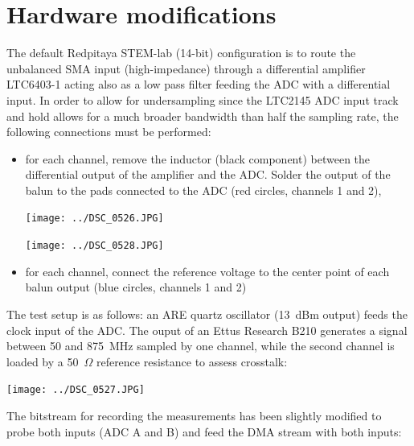 \documentclass[4paper]{article}
\begin{document}
\section{Hardware modifications}

The default Redpitaya STEM-lab (14-bit) configuration is to route the
unbalanced SMA input (high-impedance) through a differential
amplifier LTC6403-1 acting also as a low pass filter feeding the ADC with 
a differential input. In order to allow for undersampling since the LTC2145
ADC input track and hold allows for a much broader bandwidth than
half the sampling rate, the following connections must be performed:
\begin{itemize}
\item for each channel, remove the inductor (black component) between the
differential output of the amplifier and the ADC. Solder the output of the balun
to the pads connected to the ADC (red circles, channels 1 and 2),

\begin{center}
\begin{minipage}[t]{\linewidth}
\begin{minipage}{.45\linewidth}
\texttt{[image: ../DSC\_0526.JPG]}
\end{minipage}
\begin{minipage}{.46\linewidth}
\texttt{[image: ../DSC\_0528.JPG]}
\end{minipage}
\end{minipage}
\end{center}

\item for each channel, connect the reference voltage to the center point of each
balun output (blue circles, channels 1 and 2)
\end{itemize}

The test setup is as follows: an ARE quartz oscillator (13~dBm output) feeds the
clock input of the ADC. The ouput of an Ettus Research B210 generates a signal
between 50 and 875~MHz sampled by one channel, while the second channel is loaded by
a 50~$\Omega$ reference resistance to assess crosstalk:

\texttt{[image: ../DSC\_0527.JPG]}

The bitstream for recording the measurements has been slightly modified
to probe both inputs (ADC A and B) and feed the DMA stream with both inputs:
\end{document}
